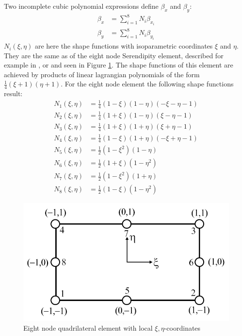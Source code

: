   Two incomplete cubic polynomial expressions define $\beta_x$ and $\beta_y$:
  \begin{align}
  \beta_x &= \sum_{i=1}^{8} N_i \beta_{x_i}\\
  \beta_y &= \sum_{i=1}^{8} N_i \beta_{y_i}
  \end{align}
  $N_i(\xi,\eta)$ are here the shape functions with isoparametric coordinates $\xi$ and $\eta$. They are the same as of the eight node Serendipity element, described for example in \cite{zienkiewicz2000finite}, or \cite{braess2007finite} and seen in Figure \ref{fig:serendipity}. The shape functions of this element are achieved by products of linear lagrangian polynomials of the form $\frac{1}{4}(\xi+1)(\eta+1)$. For the eight node element the following shape functions result:
  \begin{align}
  N_1(\xi, \eta) &= \frac{1}{4}(1-\xi)(1-\eta)(-\xi-\eta-1) \nonumber\\
  N_2(\xi, \eta) &= \frac{1}{4}(1+\xi)(1-\eta)(\xi-\eta-1) \nonumber\\
  N_3(\xi, \eta) &= \frac{1}{4}(1+\xi)(1+\eta)(\xi+\eta-1) \nonumber\\
  N_4(\xi, \eta) &= \frac{1}{4}(1-\xi)(1+\eta)(-\xi+\eta-1) \nonumber\\
  N_5(\xi, \eta) &= \frac{1}{2}(1-\xi^2)(1-\eta) \nonumber\\
  N_6(\xi, \eta) &= \frac{1}{2}(1+\xi)(1-\eta^2) \nonumber\\
  N_7(\xi, \eta) &= \frac{1}{2}(1-\xi^2)(1+\eta) \nonumber\\
  N_8(\xi, \eta) &= \frac{1}{2}(1-\xi)(1-\eta^2) \nonumber
  \end{align}
  \begin{figure}[htbp] %
  	\centering
  	\includegraphics[width=0.97\linewidth]{figures/serendipity}
  	\caption{Eight node quadrilateral element with local $\xi,\eta$-coordinates}
  	\label{fig:serendipity}
  \end{figure}
